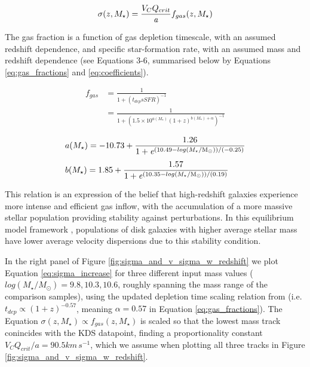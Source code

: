 \documentclass[fleqn,usenatbib]{mnras}
\begin{document}
\begin{equation}\label{eq:sigma_increase}
    \sigma(z,M_{\star}) = \frac{V_{C}Q_{crit}}{{\it a}}f_{gas}(z,M_{\star})
\end{equation}


The gas fraction is a function of gas depletion timescale, with an assumed redshift dependence, and specific star-formation rate, with an assumed mass and redshift dependence (see \citealt{Wisnioski2015} Equations 3-6, summarised below by Equations \ref{eq:gas_fractions} and \ref{eq:coefficients}).

\begin{equation}\label{eq:gas_fractions}
\begin{aligned}
    f_{gas} & = \frac{1}{1 + \left(t_{dep}sSFR\right)^{-1}} \\[1ex]
    & = \frac{1}{1 + \left(1.5\times10^{a(M_{\star})}(1 + z)^{b(M_{\star}) + \alpha}\right)^{-1}}
\end{aligned}
\end{equation}

\begin{equation}\label{eq:coefficients}
\begin{aligned}
   & a(M_{\star}) = -10.73 + \frac{1.26}{1 + {\it e}^{\left(10.49 - log(M_{\star}/{\rm M}_{\odot})\right)/(-0.25)}} \\[1ex]
   & b(M_{\star}) = 1.85 + \frac{1.57}{1 + {\it e}^{\left(10.35 - log(M_{\star}/{\rm M}_{\odot})\right)/(0.19)}}
\end{aligned}
\end{equation}


This relation is an expression of the belief that high-redshift galaxies experience more intense and efficient gas inflow, with the accumulation of a more massive stellar population providing stability against perturbations.
In this equilibrium model framework \citep[e.g.][]{Dave2012,Lilly2013,Saintonge2013}, populations of disk galaxies with higher average stellar mass have lower average velocity dispersions due to this stability condition.

In the right panel of Figure \ref{fig:sigma_and_v_sigma_w_redshift} we plot Equation \ref{eq:sigma_increase} for three different input mass values ($log(M_{\star}/M_{\odot})=9.8,10.3,10.6$, roughly spanning the mass range of the comparison samples), using the updated depletion time scaling relation from \cite{Tacconi2017} (i.e. $t_{dep} \propto (1 + z)^{-0.57}$, meaning $\alpha=0.57$ in Equation \ref{eq:gas_fractions}).
The Equation $\sigma(z,M_{\star})\propto f_{gas}(z,M_{\star})$ is scaled so that the lowest mass track conincides with the KDS datapoint, finding a proportionality constant $V_{C}Q_{crit}/a = 90.5km\,s^{-1}$, which we assume when plotting all three tracks in Figure \ref{fig:sigma_and_v_sigma_w_redshift}. \\
\end{document}
